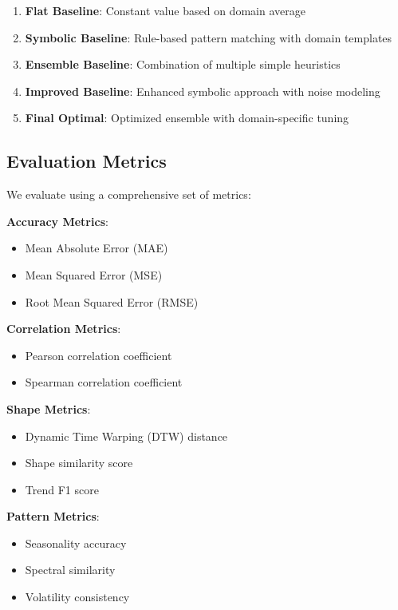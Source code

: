 \documentclass[11pt]{article}
\begin{document}
\begin{enumerate}
    \item \textbf{Flat Baseline}: Constant value based on domain average
    \item \textbf{Symbolic Baseline}: Rule-based pattern matching with domain templates
    \item \textbf{Ensemble Baseline}: Combination of multiple simple heuristics
    \item \textbf{Improved Baseline}: Enhanced symbolic approach with noise modeling
    \item \textbf{Final Optimal}: Optimized ensemble with domain-specific tuning
\end{enumerate}

\subsection{Evaluation Metrics}

We evaluate using a comprehensive set of metrics:

\textbf{Accuracy Metrics}:
\begin{itemize}
    \item Mean Absolute Error (MAE)
    \item Mean Squared Error (MSE)
    \item Root Mean Squared Error (RMSE)
\end{itemize}

\textbf{Correlation Metrics}:
\begin{itemize}
    \item Pearson correlation coefficient
    \item Spearman correlation coefficient
\end{itemize}

\textbf{Shape Metrics}:
\begin{itemize}
    \item Dynamic Time Warping (DTW) distance
    \item Shape similarity score
    \item Trend F1 score
\end{itemize}

\textbf{Pattern Metrics}:
\begin{itemize}
    \item Seasonality accuracy
    \item Spectral similarity
    \item Volatility consistency
\end{itemize}
\end{document}
